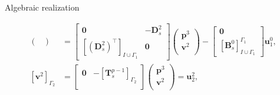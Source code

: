 \documentclass[aspectratio=169]{beamer}
\begin{document}
\begin{frame}{Algebraic realization}
{\begin{tcolorbox}
\begin{equation*}
\begin{aligned}
\begin{pmatrix}
				\end{pmatrix} &=  
				\begin{bmatrix}
					\mathbf{0} & -\mathbf{D}^{2}_s \\
					[(\mathbf{D}_{s}^{2})^\top]_{I \cup \Gamma_1} & \mathbf{0}
				\end{bmatrix}
				\begin{pmatrix}
					{\mathbf{p}}^3 \\
					{\mathbf{v}}^2 \\
				\end{pmatrix} -
				\begin{bmatrix}
					\mathbf{0}\\
					[\mathbf{B}^{0}_{s}]_{I \cup \Gamma_1}^{\Gamma_1}
				\end{bmatrix}
				\mathbf{u}^{0}_1, \\
				[{\mathbf{v}}^{2}]_{\Gamma_2} &= 
				\begin{bmatrix}
					\mathbf{0} & -[\mathbf{T}^{p-1}_{s}]_{\Gamma_2} \\
				\end{bmatrix}
				\begin{pmatrix}
					{\mathbf{p}}^3 \\
					{\mathbf{v}}^2 \\
				\end{pmatrix}  ={\mathbf{u}}^{2}_2,
			\end{aligned}
		\end{equation*}
	\end{tcolorbox} 
}
	
	
\end{frame}
\end{document}
